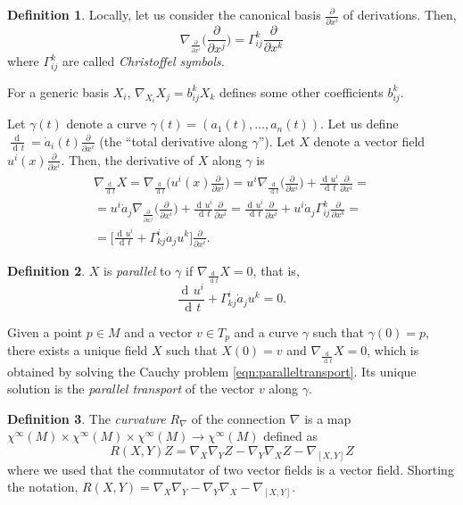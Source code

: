 \documentclass[a4paper,12pt]{book}
\newcommand{\dd}{\mathop{\mathrm{d}\!}{}}
\theoremstyle{definition}
\newtheorem{definition}{Definition}
\theoremstyle{remark}
\begin{document}
\begin{definition}
Locally, let us consider the canonical basis $\frac{\partial}{\partial x^i}$ of derivations. Then,
\[\nabla_{\frac{\partial}{\partial x^i}}\biggl(\frac{\partial}{\partial x^j}\biggr)=\Gamma_{ij}^k\frac{\partial}{\partial x^k}\]
where $\Gamma_{ij}^k$ are called \emph{Christoffel symbols}.
\end{definition}

For a generic basis $X_i$, $\nabla_{X_i}X_j=b_{ij}^kX_k$ defines some other coefficients $b_{ij}^k$.

Let $\gamma(t)$ denote a curve $\gamma(t)=(a_1(t),\ldots,a_n(t))$. Let us define $\frac{\dd}{\dd t}=\dot a_i(t)\frac{\partial}{\partial x^i}$ (the ``total derivative along $\gamma$''). Let $X$ denote a vector field $u^i(x)\frac{\partial}{\partial x^i}$. Then, the derivative of $X$ along $\gamma$ is
\begin{multline*}\nabla_{\frac{\dd}{\dd t}}X=\nabla_{\frac{\dd}{\dd t}}\biggl(u^i(x)\frac{\partial}{\partial x^i}\biggr)=u^i\nabla_{\frac{\dd}{\dd t}}\biggl(\frac{\partial}{\partial x^i}\biggr)+\frac{\dd u^i}{\dd t}\frac{\partial}{\partial x^i}=\\
=u^i\dot a_j\nabla_{\frac{\partial}{\partial x^j}}\biggl(\frac{\partial}{\partial x^i}\biggr)+\frac{\dd u^i}{\dd t}\frac{\partial}{\partial x^i}=\frac{\dd u^i}{\dd t}\frac{\partial}{\partial x^i}+u^i\dot a_j\Gamma_{ij}^k\frac{\partial}{\partial x^k}=\\
=\biggl[\frac{\dd u^i}{\dd t}+\Gamma_{kj}^i\dot a_ju^k\biggr]\frac{\partial}{\partial x^i}.\end{multline*}

\begin{definition}
$X$ is \emph{parallel} to $\gamma$ if $\nabla_{\frac{\dd}{\dd t}}X=0$, that is,
\begin{equation}
\label{eqn:paralleltransport}
\frac{\dd u^i}{\dd t}+\Gamma_{kj}^i\dot a_ju^k=0.
\end{equation}
\end{definition}

Given a point $p\in M$ and a vector $v\in T_p$ and a curve $\gamma$ such that $\gamma(0)=p$, there exists a unique field $X$ such that $X(0)=v$ and $\nabla_{\frac{\dd}{\dd t}}X=0$, which is obtained by solving the Cauchy problem \cref{eqn:paralleltransport}. Its unique solution is the \emph{parallel transport} of the vector $v$ along $\gamma$.

\begin{definition}
The \emph{curvature} $R_\nabla$ of the connection $\nabla$ is a map $\chi^\infty(M)\times\chi^\infty(M)\times\chi^\infty(M)\to\chi^\infty(M)$ defined as
\[R(X,Y)Z=\nabla_X\nabla_YZ-\nabla_Y\nabla_XZ-\nabla_{[X,Y]}Z\]
where we used that the commutator of two vector fields is a vector field. Shorting the notation, $R(X,Y)=\nabla_X\nabla_Y-\nabla_Y\nabla_X-\nabla_{[X,Y]}$.
\end{definition}
\end{document}
